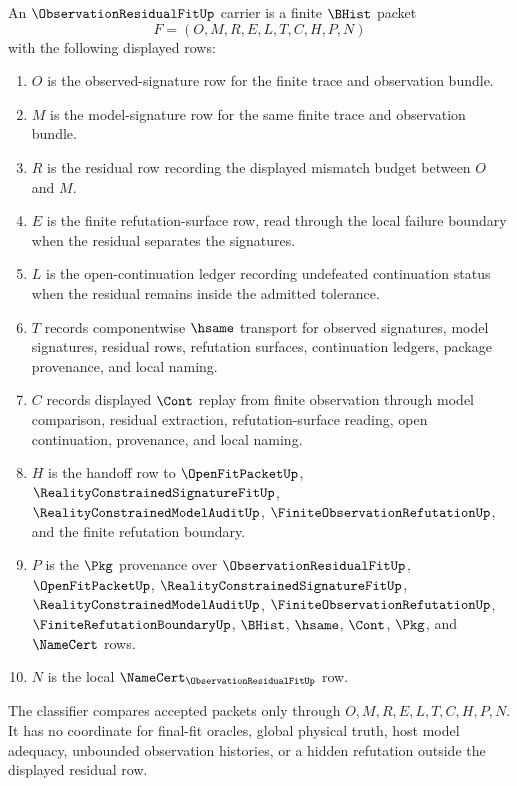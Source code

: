 \begin{definition}
\label{def:observation-residual-fit-carrier}
An $\ObservationResidualFitUp$ carrier is a finite $\BHist$ packet
$$
F=(O,M,R,E,L,T,C,H,P,N)
$$
with the following displayed rows:
\begin{enumerate}
\item $O$ is the observed-signature row for the finite trace and observation bundle.
\item $M$ is the model-signature row for the same finite trace and observation bundle.
\item $R$ is the residual row recording the displayed mismatch budget between $O$ and $M$.
\item $E$ is the finite refutation-surface row, read through the local failure boundary when the residual separates the signatures.
\item $L$ is the open-continuation ledger recording undefeated continuation status when the residual remains inside the admitted tolerance.
\item $T$ records componentwise $\hsame$ transport for observed signatures, model signatures, residual rows, refutation surfaces, continuation ledgers, package provenance, and local naming.
\item $C$ records displayed $\Cont$ replay from finite observation through model comparison, residual extraction, refutation-surface reading, open continuation, provenance, and local naming.
\item $H$ is the handoff row to $\OpenFitPacketUp$, $\RealityConstrainedSignatureFitUp$, $\RealityConstrainedModelAuditUp$, $\FiniteObservationRefutationUp$, and the finite refutation boundary.
\item $P$ is the $\Pkg$ provenance over $\ObservationResidualFitUp$, $\OpenFitPacketUp$, $\RealityConstrainedSignatureFitUp$, $\RealityConstrainedModelAuditUp$, $\FiniteObservationRefutationUp$, $\FiniteRefutationBoundaryUp$, $\BHist$, $\hsame$, $\Cont$, $\Pkg$, and $\NameCert$ rows.
\item $N$ is the local $\NameCert_{\ObservationResidualFitUp}$ row.
\end{enumerate}
The classifier compares accepted packets only through $O,M,R,E,L,T,C,H,P,N$. It has no coordinate for final-fit oracles, global physical truth, host model adequacy, unbounded observation histories, or a hidden refutation outside the displayed residual row.
\end{definition}

